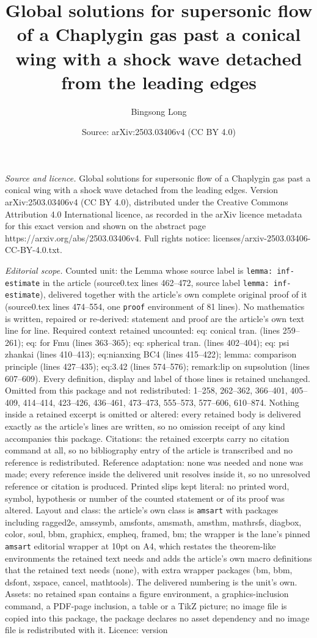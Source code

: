 \documentclass[10pt,a4paper]{amsart}
\title[Global solutions for supersonic flow of a Chaplygin gas past]{Global solutions for supersonic flow of a Chaplygin gas past a conical wing with a shock wave detached from the leading edges}
\author{Bingsong Long}
\date{Source: arXiv:2503.03406v4 (CC BY 4.0)}
\begin{document}
\maketitle

\noindent\emph{Source and licence.} Global solutions for supersonic flow of a Chaplygin gas past a conical wing with a shock wave detached from the leading edges. Version arXiv:2503.03406v4 (CC BY 4.0), distributed under the Creative Commons Attribution 4.0 International licence, as recorded in the arXiv licence metadata for this exact version and shown on the abstract page https://arxiv.org/abs/2503.03406v4. Full rights notice: licenses/arxiv-2503.03406-CC-BY-4.0.txt.\par\smallskip

\noindent\textit{Editorial scope.} Counted unit: the Lemma whose source label is \texttt{lemma: inf-estimate} in the article (source0.tex lines 462--472, source label \texttt{lemma: inf-estimate}), delivered together with the article's own complete original proof of it (source0.tex lines 474--554, one \texttt{proof} environment of 81 lines). No mathematics is written, repaired or re-derived: statement and proof are the article's own text line for line. Required context retained uncounted: eq: conical tran. (lines 259--261); eq: for Fmu (lines 363--365); eq: spherical tran. (lines 402--404); eq: psi zhankai (lines 410--413); eq:nianxing BC4 (lines 415--422); lemma: comparison principle (lines 427--435); eq:3.42 (lines 574--576); remark:lip on supsolution (lines 607--609). Every definition, display and label of those lines is retained unchanged. Omitted from this package and not redistributed: 1--258, 262--362, 366--401, 405--409, 414--414, 423--426, 436--461, 473--473, 555--573, 577--606, 610--874. Nothing inside a retained excerpt is omitted or altered: every retained body is delivered exactly as the article's lines are written, so no omission receipt of any kind accompanies this package. Citations: the retained excerpts carry no citation command at all, so no bibliography entry of the article is transcribed and no reference is redistributed. Reference adaptation: none was needed and none was made; every reference inside the delivered unit resolves inside it, so no unresolved reference or citation is produced. Printed slips kept literal: no printed word, symbol, hypothesis or number of the counted statement or of its proof was altered. Layout and class: the article's own class is \texttt{amsart} with packages including ragged2e, amssymb, amsfonts, amsmath, amsthm, mathrsfs, diagbox, color, soul, bbm, graphicx, empheq, framed, bm; the wrapper is the lane's pinned \texttt{amsart} editorial wrapper at 10pt on A4, which restates the theorem-like environments the retained text needs and adds the article's own macro definitions that the retained text needs (none), with extra wrapper packages (bm, bbm, dsfont, xspace, cancel, mathtools). The delivered numbering is the unit's own. Assets: no retained span contains a figure environment, a graphics-inclusion command, a PDF-page inclusion, a table or a TikZ picture; no image file is copied into this package, the package declares no asset dependency and no image file is redistributed with it. Licence: version 
\end{document}
